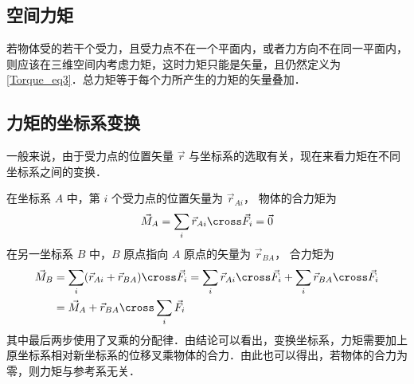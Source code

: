 \subsection{空间力矩}
若物体受的若干个受力，且受力点不在一个平面内，或者力方向不在同一平面内，则应该在三维空间内考虑力矩，这时力矩只能是矢量，且仍然定义为\autoref{Torque_eq3}．总力矩等于每个力所产生的力矩的矢量叠加．

\subsection{力矩的坐标系变换}
一般来说，由于受力点的位置矢量 $\vec r$ 与坐标系的选取有关，现在来看力矩在不同坐标系之间的变换．

在坐标系 $A$ 中，第 $i$ 个受力点的位置矢量为 ${\vec r_{Ai}}$， 物体的合力矩为
\begin{equation}
{\vec M_A} = \sum_i \vec r_{Ai} \cross \vec F_i  = \vec 0
\end{equation}
在另一坐标系 $B$ 中，$B$ 原点指向 $A$ 原点的矢量为 ${\vec r_{BA}}$， 合力矩为
\begin{equation}\label{Torque_eq5}
\begin{aligned}
\vec M_B &= \sum_i (\vec r_{Ai} + \vec r_{BA}) \cross \vec F_i = \sum_i \vec r_{Ai} \cross \vec F_i + \sum_i \vec r_{BA} \cross \vec F_i \\
&= \vec M_A + \vec r_{BA}\cross \sum_i \vec F_i
\end{aligned}
\end{equation}
其中最后两步使用了叉乘的分配律．由结论可以看出，变换坐标系，力矩需要加上原坐标系相对新坐标系的位移叉乘物体的合力．由此也可以得出，若物体的合力为零，则力矩与参考系无关．



